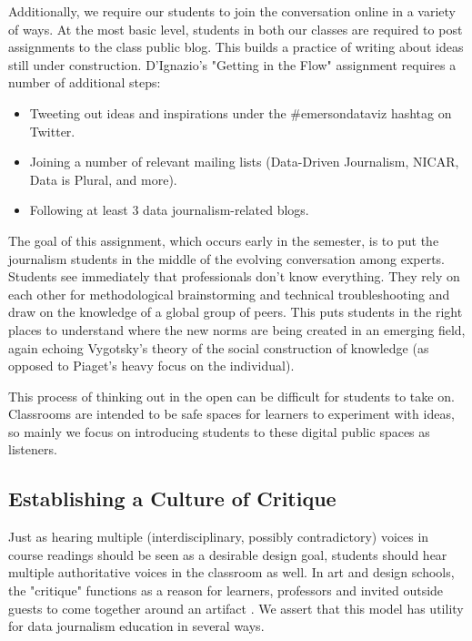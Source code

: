 \documentclass{acm_proc_article-sp}
\begin{document}
Additionally, we require our students to join the conversation online in a variety of ways.  At the most basic level, students in both our classes are required to post assignments to the class public blog. This builds a practice of writing about ideas still under construction. D'Ignazio's "Getting in the Flow" assignment requires a number of additional steps:

\begin{itemize}
  \item Tweeting out ideas and inspirations under the \#emersondataviz hashtag on Twitter.
  \item Joining a number of relevant mailing lists (Data-Driven Journalism, NICAR, Data is Plural, and more). 
  \item Following at least 3 data journalism-related blogs.
\end{itemize}

The goal of this assignment, which occurs early in the semester, is to put the journalism students in the middle of the evolving conversation among experts. Students see immediately that professionals don't know everything. They rely on each other for methodological brainstorming and technical troubleshooting and draw on the knowledge of a global group of peers. This puts students in the right places to understand where the new norms are being created in an emerging field, again echoing Vygotsky's theory of the social construction of knowledge (as opposed to Piaget's heavy focus on the individual).

This process of thinking out in the open can be difficult for students to take on.  Classrooms are intended to be safe spaces for learners to experiment with ideas, so mainly we focus on introducing students to these digital public spaces as listeners.

\subsection{Establishing a Culture of Critique}

Just as hearing multiple (interdisciplinary, possibly contradictory) voices in course readings should be seen as a desirable design goal, students should hear multiple authoritative voices in the classroom as well. In art and design schools, the "critique" functions as a reason for learners, professors and invited outside guests to come together around an artifact \cite{buster_critique_2007}. We assert that this model has utility for data journalism education in several ways. 
\end{document}
